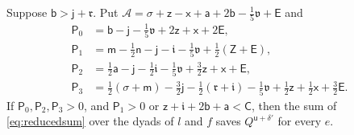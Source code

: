 \documentclass[11pt,colorlinks]{charlie}
\begin{document}
\begin{lemma}\label{lem:square}
Suppose $\mathsf b>\mathsf j+\mathfrak r$. Put $\mathcal A=\sigma+\mathsf z-\mathsf x+\mathsf a+2\mathsf b-\frac15\mathfrak v+\mathsf E$ and
\[
 \begin{aligned}
 \mathsf P_0&=\mathsf b-\mathsf j-\tfrac15\mathfrak v+2\mathsf z+\mathsf x+2\mathsf E,\\
 \mathsf P_1&=\mathsf m-\tfrac12\mathsf n-\mathsf j-\mathfrak i-\tfrac15\mathfrak v+\tfrac12(\mathsf Z+\mathsf E),\\
 \mathsf P_2&=\tfrac12\mathsf a-\mathsf j-\tfrac12\mathfrak i-\tfrac15\mathfrak v+\tfrac32\mathsf z+\mathsf x+\mathsf E,\\
 \mathsf P_3&=\tfrac12(\sigma+\mathsf m)-\tfrac32\mathsf j-\tfrac12(\mathfrak r+\mathfrak i)-\tfrac15\mathfrak v+\tfrac12\mathsf z+\tfrac12\mathsf x+\tfrac32\mathsf E .
 \end{aligned}
\]
If $\mathsf P_0,\mathsf P_2,\mathsf P_3>0$, and $\mathsf P_1>0$ or $\mathsf z+\mathfrak i+2\mathsf b+\mathsf a<\mathsf C$, then the sum of \eqref{eq:reducedsum} over the dyads of $l$ and $f$ saves $Q^{\mathsf u+\delta'}$ for every $e$.
\end{lemma}
\end{document}
